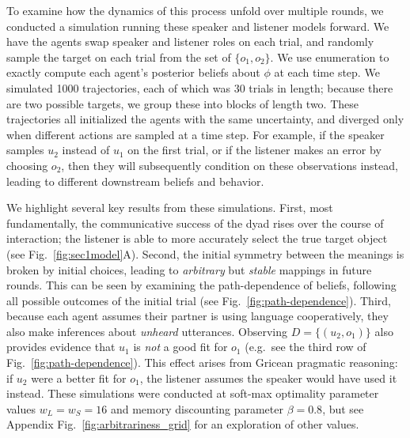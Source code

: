 To examine how the dynamics of this process unfold over multiple rounds, we conducted a simulation running these speaker and listener models forward.
We have the agents swap speaker and listener roles on each trial, and randomly sample the target on each trial from the set of $\{o_1, o_2\}$.
We use enumeration to exactly compute each agent's posterior beliefs about $\phi$ at each time step.
We simulated 1000 trajectories, each of which was 30 trials in length; because there are two possible targets, we group these into blocks of length two.
These trajectories all initialized the agents with the same uncertainty, and diverged only when different actions are sampled at a time step.
For example, if the speaker samples $u_2$ instead of $u_1$ on the first trial, or if the listener makes an error by choosing $o_2$, then they will subsequently condition on these observations instead, leading to different downstream beliefs and behavior.


We highlight several key results from these simulations.
First, most fundamentally, the communicative success of the dyad rises over the course of interaction; the listener is able to more accurately select the true target object (see Fig.~\ref{fig:sec1model}A). 
Second, the initial symmetry between the meanings is broken by initial choices, leading to \emph{arbitrary} but \emph{stable} mappings in future rounds.
This can be seen by examining the path-dependence of beliefs, following all possible outcomes of the initial trial (see Fig.~\ref{fig:path-dependence}). 
Third, because each agent assumes their partner is using language cooperatively, they also make inferences about \emph{unheard} utterances. 
Observing $D = \{(u_2, o_1)\}$ also provides evidence that $u_1$ is \emph{not} a good fit for $o_1$ (e.g.~see the third row of Fig.~\ref{fig:path-dependence}).
This effect arises from Gricean pragmatic reasoning: if $u_2$ were a better fit for $o_1$, the listener assumes the speaker would have used it instead. 
These simulations were conducted at soft-max optimality parameter values $w_L = w_S = 16$ and memory discounting parameter $\beta = 0.8$, but see Appendix Fig.~\ref{fig:arbitrariness_grid} for an exploration of other values.

